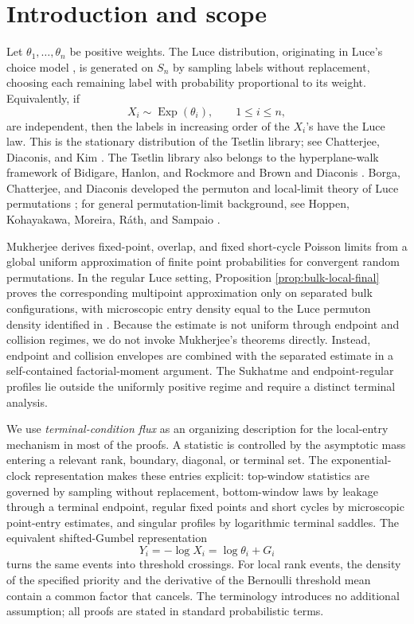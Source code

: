 \documentclass[11pt]{article}
\theoremstyle{remark}
\newcommand{\Exp}{\operatorname{Exp}}
\begin{document}
\medskip
\tableofcontents

\section{Introduction and scope}

Let $\theta_1,\ldots,\theta_n$ be positive weights.  The Luce distribution,
originating in Luce's choice model \cite{Luce1959}, is generated on $S_n$ by
sampling labels without replacement, choosing each remaining label with
probability proportional to its weight.  Equivalently, if
\[
        X_i\sim\Exp(\theta_i),\qquad 1\le i\le n,
\]
are independent, then the labels in increasing order of the $X_i$'s have the
Luce law.  This is the stationary distribution of the Tsetlin library; see
Chatterjee, Diaconis, and Kim \cite{CDK2024}.  The Tsetlin library also belongs
to the hyperplane-walk framework of Bidigare, Hanlon, and Rockmore
\cite{BHR1999} and Brown and Diaconis \cite{BD1998}.  Borga, Chatterjee, and
Diaconis developed the permuton and local-limit theory of Luce permutations
\cite{BCD2025}; for general permutation-limit background, see Hoppen,
Kohayakawa, Moreira, R\'ath, and Sampaio \cite{HKMRS2013}.

Mukherjee \cite[Theorems~1.4, 1.6, and~1.9]{Mukherjee2016} derives fixed-point,
overlap, and fixed short-cycle Poisson limits from a global uniform
approximation of finite point probabilities for convergent random permutations.
In the regular Luce setting, Proposition \ref{prop:bulk-local-final} proves the
corresponding multipoint approximation only on separated bulk configurations,
with microscopic entry density equal to the Luce permuton density identified
in \cite[Theorem~2.1 and Proposition~2.2]{BCD2025}.  Because the estimate is not
uniform through endpoint and collision regimes, we do not invoke Mukherjee's
theorems directly.  Instead, endpoint and collision envelopes are combined with
the separated estimate in a self-contained factorial-moment argument.  The
Sukhatme and endpoint-regular profiles lie outside the uniformly positive
regime and require a distinct terminal analysis.

We use \emph{terminal-condition flux} as an organizing description for the
local-entry mechanism in most of the proofs.  A statistic is controlled by the
asymptotic mass entering a relevant rank, boundary, diagonal, or terminal set.
The exponential-clock representation makes these entries explicit: top-window
statistics are governed by sampling without replacement, bottom-window laws by
leakage through a terminal endpoint, regular fixed points and short cycles by
microscopic point-entry estimates, and singular profiles by logarithmic
terminal saddles.  The equivalent shifted-Gumbel representation
\[
        Y_i=-\log X_i=\log\theta_i+G_i
\]
turns the same events into threshold crossings.  For local rank events, the
density of the specified priority and the derivative of the Bernoulli threshold
mean contain a common factor that cancels.  The terminology introduces no
additional assumption; all proofs are stated in standard probabilistic terms.
\end{document}
